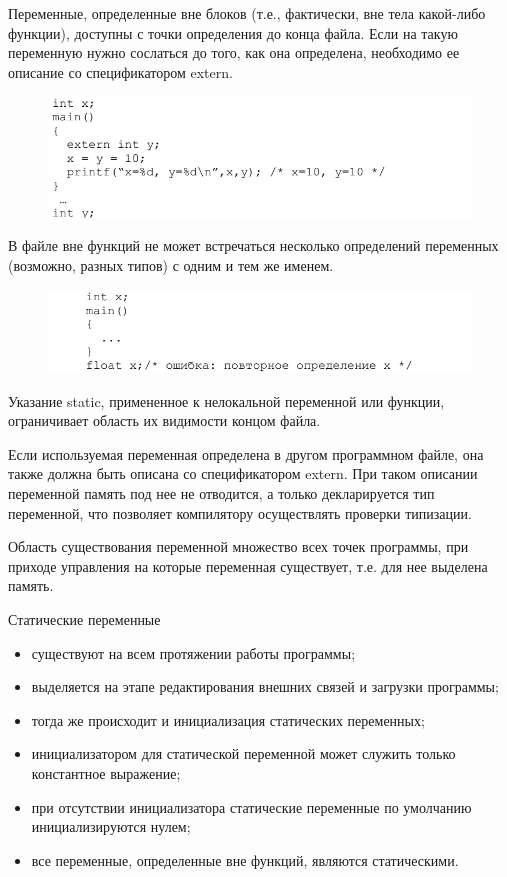 \documentclass{beamer}
\begin{document}
\begin{frame}
Переменные, определенные вне блоков (т.е., фактически, вне тела какой-либо функции), доступны с точки определения до конца файла. Если на такую переменную нужно сослаться до того, как она определена, необходимо ее описание со спецификатором extern.
\begin{figure}[h]
\centering
\includegraphics[scale=0.5]{images/lec03-pic08.png}
\end{figure}
\end{frame}

\begin{frame}
В файле вне функций не может встречаться несколько определений переменных (возможно, разных типов) с одним и тем же именем.
\begin{figure}[h]
\centering
\includegraphics[scale=0.5]{images/lec03-pic09.png}
\end{figure}
Указание static, примененное к нелокальной переменной или функции, ограничивает область их видимости концом файла.

Если используемая переменная определена в другом программном файле, она также должна быть описана со спецификатором extern. При таком описании переменной память под нее не отводится, а только декларируется тип переменной, что позволяет
компилятору осуществлять проверки типизации.
\end{frame}

\begin{frame}
\begin{block}{Область существования переменной}
множество всех точек программы, при приходе управления на которые переменная
существует, т.е. для нее выделена память.
\end{block}
Статические переменные
\begin{itemize}
\item существуют на всем протяжении работы программы;
\item выделяется на этапе редактирования внешних связей и загрузки программы;
\item тогда же происходит и инициализация статических переменных;
\item инициализатором для статической переменной может служить только константное выражение;
\item при отсутствии инициализатора статические переменные по умолчанию инициализируются нулем;
\item все переменные, определенные вне функций, являются статическими.
\end{itemize}
\end{frame}
\end{document}
